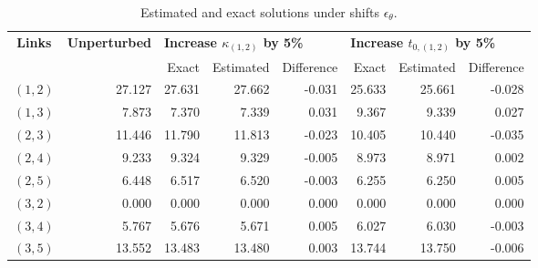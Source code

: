\documentclass[a4paper,11pt]{article}
\begin{document}
\begin{table}[H]
\captionsetup{justification=centering}
\caption{Estimated and exact solutions under shifts $\epsilon_{\theta}$.}\label{tab:exact_estimate_opt}
\setlength\tabcolsep{6pt}
\centering
\begin{tabular}{c|r|rrr|rrr}
\multicolumn{1}{c}{\multirow{2}{*}{\textbf{Links}}} & \multicolumn{1}{c}{\multirow{2}{*}{\textbf{Unperturbed}}} & \multicolumn{3}{l}{\textbf{Increase $\kappa_{(1,2)}$ by 5\%}} & \multicolumn{3}{l}{\textbf{Increase $t_{0,(1,2)}$ by 5\%}} \\
\multicolumn{1}{c}{}                       & \multicolumn{1}{c}{}                             & Exact           & Estimated         & Difference         & Exact             & Estimated            & Difference           \\
\midrule
$(1, 2)$                                          & 27.127                                           & 27.631          & 27.662            & -0.031             & 25.633            & 25.661               & -0.028               \\
$(1, 3)$                                          & 7.873                                            & 7.370           & 7.339             & 0.031              & 9.367             & 9.339                & 0.027                \\
$(2, 3)$                                          & 11.446                                           & 11.790          & 11.813            & -0.023             & 10.405            & 10.440               & -0.035               \\
$(2, 4)$                                          & 9.233                                            & 9.324           & 9.329             & -0.005             & 8.973             & 8.971                & 0.002                \\
$(2, 5)$                                         & 6.448                                            & 6.517           & 6.520             & -0.003             & 6.255             & 6.250                & 0.005                \\
$(3, 2)$                                          & 0.000                                            & 0.000           & 0.000             & 0.000              & 0.000             & 0.000                & 0.000                \\
$(3, 4)$                                         & 5.767                                            & 5.676           & 5.671             & 0.005              & 6.027             & 6.030                & -0.003               \\
$(3, 5)$                                          & 13.552                                           & 13.483          & 13.480            & 0.003              & 13.744            & 13.750               & -0.006              \\
\bottomrule
\end{tabular}
\end{table}
\end{document}
